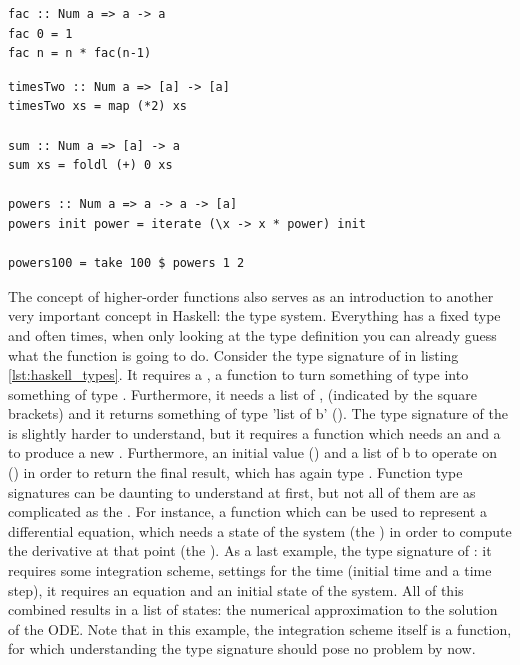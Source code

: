 \begin{lstlisting}[caption=Recursive functions, label=lst:rec_function]
fac :: Num a => a -> a
fac 0 = 1
fac n = n * fac(n-1)
\end{lstlisting}

\begin{lstlisting}[caption=Higher order functions, label=lst:ho_functions]
timesTwo :: Num a => [a] -> [a]
timesTwo xs = map (*2) xs

sum :: Num a => [a] -> a
sum xs = foldl (+) 0 xs

powers :: Num a => a -> a -> [a]
powers init power = iterate (\x -> x * power) init

powers100 = take 100 $ powers 1 2
\end{lstlisting}

The concept of higher-order functions also serves as an introduction to another very important concept in Haskell: the type system. Everything has a fixed type and often times, when only looking at the type definition you can already guess what the function is going to do. Consider the type signature of  in listing \ref{lst:haskell_types}. It requires a , a function to turn something of type  into something of type . Furthermore, it needs a list of , \code{[a]} (indicated by the square brackets) and it returns something of type 'list of b' (\code{[b]}). The type signature of the  is slightly harder to understand, but it requires a function which needs an  and a  to produce a new . Furthermore, an initial value () and a list of b to operate on (\code{[b]}) in order to return the final result, which has again type . Function type signatures can be daunting to understand at first, but not all of them are as complicated as the . For instance, a function which can be used to represent a differential equation, which needs a state of the system (the ) in order to compute the derivative at that point (the ). As a last example, the type signature of : it requires some integration scheme, settings for the time (initial time and a time step), it requires an equation and an initial state of the system. All of this combined results in a list of states: the numerical approximation to the solution of the ODE. Note that in this example, the integration scheme  itself is a function, for which understanding the type signature should pose no problem by now.

